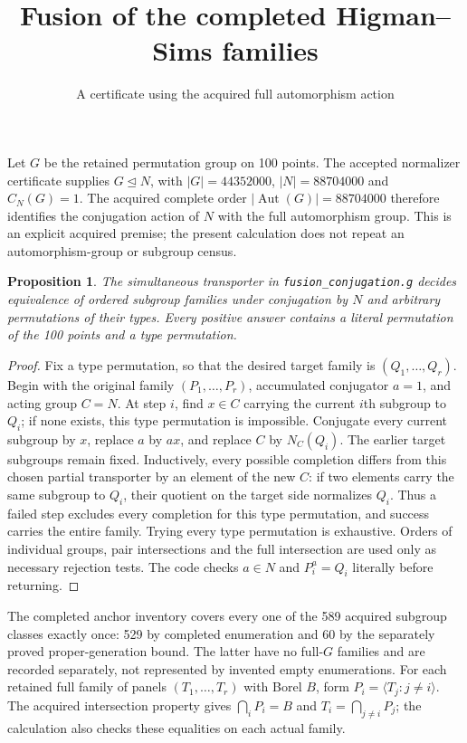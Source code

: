 \documentclass[11pt]{article}
\title{Fusion of the completed Higman--Sims families}
\author{A certificate using the acquired full automorphism action}
\date{}
\newtheorem{proposition}{Proposition}
\begin{document}
\maketitle
Let $G$ be the retained permutation group on 100 points. The accepted
normalizer certificate supplies $G\trianglelefteq N$, with
$|G|=44352000$, $|N|=88704000$ and $C_N(G)=1$.
The acquired complete order $|\operatorname{Aut}(G)|=88704000$ therefore
identifies the conjugation action of $N$ with the full automorphism group.
This is an explicit acquired premise; the present calculation does not
repeat an automorphism-group or subgroup census.

\begin{proposition}
The simultaneous transporter in \texttt{fusion\_conjugation.g} decides
equivalence of ordered subgroup families under conjugation by $N$ and
arbitrary permutations of their types. Every positive answer contains a
literal permutation of the 100 points and a type permutation.
\end{proposition}
\begin{proof}
Fix a type permutation, so that the desired target family is
$(Q_1,\ldots,Q_r)$. Begin with the original family $(P_1,\ldots,P_r)$,
accumulated conjugator $a=1$, and acting group $C=N$. At step $i$, find
$x\in C$ carrying the current $i$th subgroup to $Q_i$; if none exists,
this type permutation is impossible. Conjugate every current subgroup
by $x$, replace $a$ by $ax$, and replace $C$ by $N_C(Q_i)$.
The earlier target subgroups remain fixed. Inductively, every possible
completion differs from this chosen partial transporter by an element
of the new $C$: if two elements carry the same subgroup to $Q_i$,
their quotient on the target side normalizes $Q_i$.
Thus a failed step excludes every completion for this type permutation,
and success carries the entire family. Trying every type permutation
is exhaustive. Orders of individual groups, pair intersections and the
full intersection are used only as necessary rejection tests.
The code checks $a\in N$ and $P_i^a=Q_i$ literally before returning.
\end{proof}

The completed anchor inventory covers every one of the 589 acquired
subgroup classes exactly once: 529 by completed enumeration and 60 by
the separately proved proper-generation bound. The latter have no
full-$G$ families and are recorded separately, not represented by
invented empty enumerations. For each retained full family of panels
$(T_1,\ldots,T_r)$ with Borel $B$, form
$P_i=\langle T_j:j\ne i\rangle$. The acquired intersection property
gives $\bigcap_iP_i=B$ and $T_i=\bigcap_{j\ne i}P_j$; the calculation
also checks these equalities on each actual family.
\end{document}

